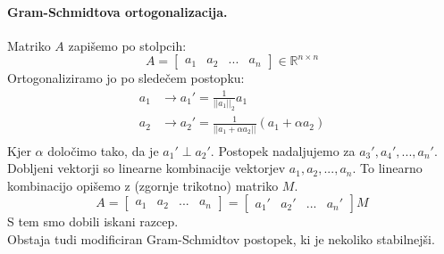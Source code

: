 \documentclass[a4paper]{article}
\newcommand{\R}{\mathbb{R}}
\begin{document}
\paragraph{Gram-Schmidtova ortogonalizacija.} Matriko \(A\) zapišemo po stolpcih:
\[A = \begin{bmatrix}
    a_1 & a_2 & ... & a_n
\end{bmatrix} \in \R^{n \times n}\]
Ortogonaliziramo jo po sledečem postopku:
\begin{align*}
    a_1 & \to a_1' = \frac{1}{||a_1||_2}a_1 \\
    a_2 & \to a_2' = \frac{1}{||a_1 + \alpha a_2||} (a_1 + \alpha a_2) \\
\end{align*}
Kjer \(\alpha\) določimo tako, da je \(a_1' \perp a_2'\). Postopek nadaljujemo za \(a_3', a_4', ..., a_n'\).
Dobljeni vektorji so linearne kombinacije vektorjev \(a_1, a_2, ..., a_n\). To linearno kombinacijo opišemo z (zgornje trikotno) matriko \(M\).
\[A = \begin{bmatrix}
    a_1 & a_2 & ... & a_n
\end{bmatrix} = \begin{bmatrix}
    a_1' & a_2' & ... & a_n'
\end{bmatrix} M\]
S tem smo dobili iskani razcep. \\[3mm]
Obstaja tudi modificiran Gram-Schmidtov postopek, ki je nekoliko stabilnejši.
\end{document}

